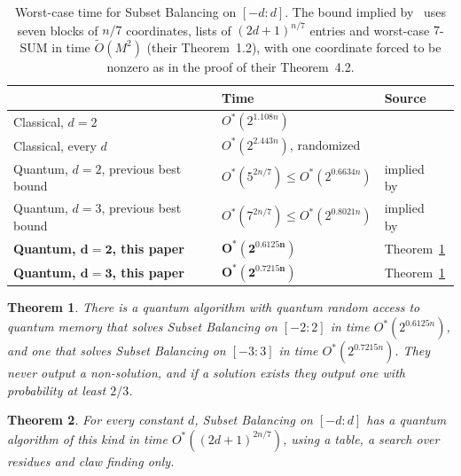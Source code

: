 \documentclass[11pt]{article}
\newtheorem{theorem}{Theorem}[section]
\theoremstyle{remark}
\newcommand{\Ot}{\tilde O}
\newcommand{\cc}[1]{[-#1:#1]}
\begin{document}
\begin{table}[h]
\centering
\small
\renewcommand{\arraystretch}{1.25}
\begin{tabular}{@{}lll@{}}
\toprule
& Time & Source\\
\midrule
Classical, $d=2$ & $O^*(2^{1.108n})$ & \cite{RW26}\\
Classical, every $d$ & $O^*(2^{2.443n})$, randomized & \cite{GFHP26}\\
Quantum, $d=2$, previous best bound & $O^*(5^{2n/7})\le O^*(2^{0.6634n})$ & implied by~\cite{CKLM26}\\
Quantum, $d=3$, previous best bound & $O^*(7^{2n/7})\le O^*(2^{0.8021n})$ & implied by~\cite{CKLM26}\\
\textbf{Quantum, $\mathbf{d=2}$, this paper} & $\mathbf{O^*(2^{0.6125n})}$ & Theorem~\ref{thm:main}\\
\textbf{Quantum, $\mathbf{d=3}$, this paper} & $\mathbf{O^*(2^{0.7215n})}$ & Theorem~\ref{thm:main}\\
\bottomrule
\end{tabular}
\caption{Worst-case time for Subset Balancing on $\cc d$. The bound implied by~\cite{CKLM26} uses seven blocks of $n/7$ coordinates, lists of $(2d+1)^{n/7}$ entries and worst-case $7$-SUM in time $\Ot(M^2)$ (their Theorem~1.2), with one coordinate forced to be nonzero as in the proof of their Theorem~4.2.}
\label{tab:results}
\end{table}

\begin{theorem}\label{thm:main}
There is a quantum algorithm with quantum random access to quantum memory that solves Subset Balancing on $\cc2$ in time $O^*(2^{0.6125n})$, and one that solves Subset Balancing on $\cc3$ in time $O^*(2^{0.7215n})$. They never output a non-solution, and if a solution exists they output one with probability at least $2/3$.
\end{theorem}

\begin{theorem}\label{thm:empty}
For every constant $d$, Subset Balancing on $\cc d$ has a quantum algorithm of this kind in time $O^*((2d+1)^{2n/7})$, using a table, a search over residues and claw finding only.
\end{theorem}
\end{document}
